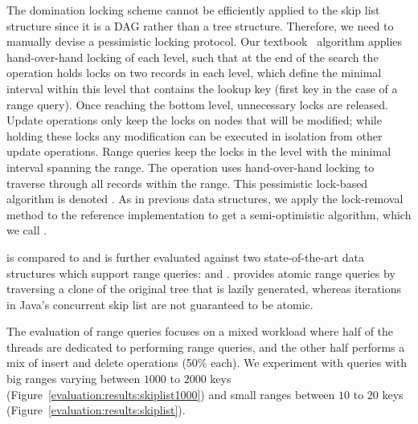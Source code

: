 The domination locking scheme cannot be efficiently applied to the skip list
structure since it is a DAG rather than a tree structure. Therefore, we need to
manually devise a pessimistic locking protocol. Our
textbook~\cite{HerlihyS2008} algorithm applies hand-over-hand locking of each
level, such that at the end of the search the operation holds locks on two
records in each level, which define the minimal interval within this level that
contains the lookup key (first key in the case of a range query). Once reaching
the bottom level, unnecessary locks are released. Update operations only keep
the locks on nodes that will be modified; while holding these locks any
modification can be executed in isolation from other update operations. Range
queries keep the locks in the level with the minimal interval spanning the
range. The operation uses hand-over-hand locking to traverse through all records
within the range. This pessimistic lock-based algorithm is denoted \domSkiplist. 
As in previous data structures, we  apply the lock-removal method to the
reference implementation to get a semi-optimistic algorithm, which we call
\autoSkiplist.  

\autoSkiplist is compared to \domSkiplist and is further evaluated against two
state-of-the-art data structures which support range queries: \bronson and
\skiplist.
\bronson provides atomic range queries by traversing a clone of the
original tree that is lazily generated,
whereas iterations in Java's concurrent skip list are not
guaranteed to be atomic.

The evaluation of range queries focuses on a mixed workload where half of the
threads are dedicated to performing range queries, and the other half performs a
mix of insert and delete operations (50\% each). 
We experiment with queries with big ranges varying between $1000$ to $2000$ keys
(Figure~\ref{evaluation:results:skiplist1000}) and small ranges
between $10$ to $20$
keys (Figure~\ref{evaluation:results:skiplist}).


% 

